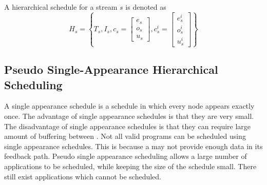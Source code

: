 A hierarchical schedule for a stream $s$ is denoted as $$H_s =
\left\{T_s, I_s, c_s = \left[\begin{array}{c}
e_s\\o_s\\u_s\end{array}\right], c^i_s =
\left[\begin{array}{c}e^i_s\\o^i_s\\u^i_s\end{array}\right]\right\}$$

\subsection{Pseudo Single-Appearance Hierarchical Scheduling}
\label{sec:sas}

\begin{comment}
\begin{figure}
\begin{minipage}{1.5in}
\centering \psfig{figure=pipeline-steady-state.eps,width=0.6in} \\
{\protect\small (a) A sample {\pipeline}}
\end{minipage}
~
\begin{minipage}{1.5in}
\centering \psfig{figure=splitjoin-steady-state.eps,width=1.2in} \\
{\protect\small (b) A sample {\splitjoin}}
\end{minipage}
~
\begin{minipage}{2.5in}
\centering \psfig{figure=feedback-hierarchical.eps,width=1.0in} \\
{\protect\small (c) A sample {\feedbackloop}.\\ $delay_{fl} = 15$ \\
The $L$ {\filter} has been flipped upside-down for clarity. \\$e_L
= 9, o_L = 5, u_L = 6$ }
\end{minipage}
\caption{Sample {\StreamIt} streams used for Pseudo
Single-Appearance Hierarchical Scheduling}
\label{fig:hierarchical-schedule}
\end{figure}
\end{comment}

A single appearance schedule is a schedule in which every node
appears exactly once. The advantage of single appearance schedules
is that they are very small. The disadvantage of single appearance
schedules is that they can require large amount of buffering
between {\filters}. Not all valid {\StreamIt} programs can be
scheduled using single appearance schedules. This is because a
{\feedbackloop} may not provide enough data in its feedback path.
Pseudo single appearance scheduling allows a large number of
applications to be scheduled, while keeping the size of the
schedule small. There still exist applications which cannot be
scheduled.

